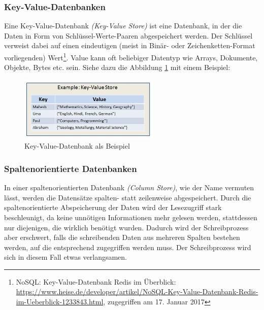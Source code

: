 \subsubsection{Key-Value-Datenbanken}

Eine Key-Value-Datenbank \textit{(Key-Value Store)} ist eine Datenbank, in der die Daten in Form von Schlüssel-Werte-Paaren abgespeichert werden. Der Schlüssel verweist dabei auf einen eindeutigen (meist in Binär- oder Zeichenketten-Format vorliegenden) Wert\footnote{NoSQL: Key-Value-Datenbank Redis im Überblick: \url{https://www.heise.de/developer/artikel/NoSQL-Key-Value-Datenbank-Redis-im-Ueberblick-1233843.html}, zugegriffen am 17. Januar 2017}. Value kann oft beliebiger Datentyp wie Arrays, Dokumente, Objekte, Bytes etc. sein. Siehe dazu die Abbildung \ref{img:kvdb} mit einem Beispiel:

\begin{figure}[H]
\centering
\includegraphics[width=0.6\textwidth]{resources/kvdb}
\caption[NoSQL: A Silver Bullet for handling Big Data?]{Key-Value-Datenbank als Beispiel\protect\footnotemark}
\label{img:kvdb}
\end{figure}


\subsubsection{Spaltenorientierte Datenbanken}

In einer spaltenorientierten Datenbank \textit{(Column Store)}, wie der Name vermuten lässt, werden die Datensätze spalten- statt zeilenweise abgespeichert. Durch die spaltenorientierte Abspeicherung der Daten wird der Lesezugriff stark beschleunigt, da keine unnötigen Informationen mehr gelesen werden, stattdessen nur diejenigen, die wirklich benötigt wurden. Dadurch wird der Schreibprozess aber erschwert, falls die schreibenden Daten aus mehreren Spalten bestehen werden, auf die entsprechend zugegriffen werden muss. Der Schreibprozess wird sich in diesem Fall etwas verlangsamen.

